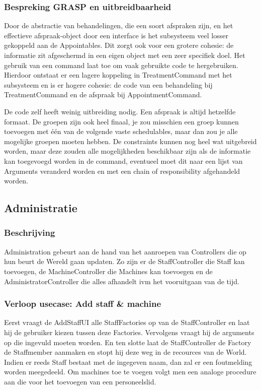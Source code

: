 \documentclass[a4paper]{article}
\begin{document}
\subsubsection{Bespreking GRASP en uitbreidbaarheid}
Door de abstractie van behandelingen, die een soort afspraken zijn, en het effectieve afspraak-object door een interface is het subsysteem veel losser gekoppeld aan de Appointables.
Dit zorgt ook voor een grotere cohesie: de informatie zit afgeschermd in een eigen object met een zeer specifiek doel. Het gebruik van een command laat toe om vaak gebruikte code te hergebruiken. Hierdoor ontstaat er een lagere koppeling in TreatmentCommand met het subsysteem en is er hogere cohesie: de code van een behandeling bij TreatmentCommand en de afspraak bij AppointmentCommand.

De code zelf heeft weinig uitbreiding nodig. Een afspraak is altijd hetzelfde formaat. De groepen zijn ook heel finaal, je zou misschien een groep kunnen toevoegen met één van de volgende vaste schedulables, maar dan zou je alle mogelijke groepen moeten hebben. De constraints kunnen nog heel wat uitgebreid worden, maar deze zouden alle mogelijkheden beschikbaar zijn als de informatie kan toegevoegd worden in de command, eventueel moet dit naar een lijst van Arguments veranderd worden en met een chain of responsibility afgehandeld worden.

\subsection{Administratie}
\subsubsection{Beschrijving}
Administration gebeurt aan de hand van het aanroepen van Controllers die op hun beurt de Wereld gaan updaten. Zo zijn er de StaffController die Staff kan toevoegen, de MachineController die Machines kan toevoegen en de AdministratorController die alles afhandelt ivm het vooruitgaan van de tijd.
\subsubsection{Verloop usecase: Add staff \& machine}
Eerst vraagt de AddStaffUI alle StaffFactories op van de StaffController en laat hij de gebruiker kiezen tussen deze Factories. Vervolgens vraagt hij de arguments op die ingevuld moeten worden. En ten slotte laat de StaffController de Factory de Staffmember aanmaken en stopt hij deze weg in de recources van de World. Indien er reeds Staff bestaat met de ingegeven naam, dan zal er een foutmelding worden meegedeeld.
Om machines toe te voegen volgt men een analoge procedure aan die voor het toevoegen van een personeelslid.
\end{document}
